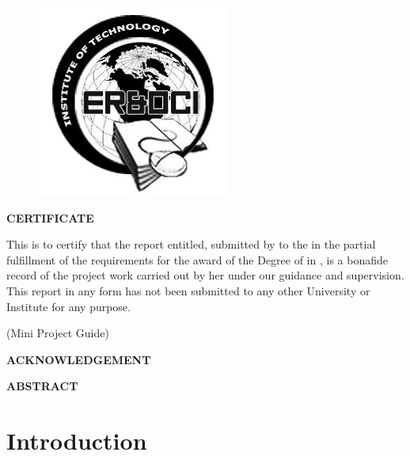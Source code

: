 \documentclass[12pt,a4paper]{report}
\begin{document}

\newpage
\thispagestyle{empty}
\begin{center}
{\insti{}}

\begin{figure}[ht]
\centering
\includegraphics[scale=0.5]{logo}
\end{figure}
{\large{\textbf{CERTIFICATE}}}

\end{center}

This is to certify that the report entitled,\textbf{ \projectname{}} submitted by \textbf{\stud{}} to the \uni{} in the partial fulfillment of the requirements for the award of the Degree of \degree{} in \stream{}, \depts{} is a bonafide record of the project work carried out by her under our guidance and supervision. This report in any form has not been submitted to any other University or Institute for any purpose.
\vspace{25mm}
 \\         
 \begin{flushright} (Mini Project Guide) \end{flushright} 
                                                                                     

\newpage
{}
\begin{center}
\textbf{ACKNOWLEDGEMENT}
\end{center} 

\newpage
\begin{center}
\textbf{ABSTRACT}
\end{center}  




\tableofcontents
\listoffigures
\newpage


\chapter{Introduction}

\end{document}
